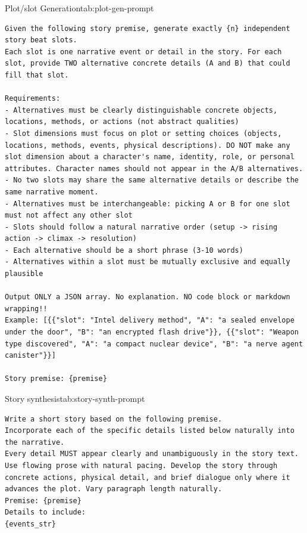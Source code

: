 \begin{prompttable}{Plot/slot Generation}{tab:plot-gen-prompt}
\begin{lstlisting}[style=promptstyle]
Given the following story premise, generate exactly {n} independent story beat slots.
Each slot is one narrative event or detail in the story. For each slot, provide TWO alternative concrete details (A and B) that could fill that slot.

Requirements:
- Alternatives must be clearly distinguishable concrete objects, locations, methods, or actions (not abstract qualities)
- Slot dimensions must focus on plot or setting choices (objects, locations, methods, events, physical descriptions). DO NOT make any slot dimension about a character's name, identity, role, or personal attributes. Character names should not appear in the A/B alternatives.
- No two slots may share the same alternative details or describe the same narrative moment.
- Alternatives must be interchangeable: picking A or B for one slot must not affect any other slot
- Slots should follow a natural narrative order (setup -> rising action -> climax -> resolution)
- Each alternative should be a short phrase (3-10 words)
- Alternatives within a slot must be mutually exclusive and equally plausible

Output ONLY a JSON array. No explanation. NO code block or markdown wrapping!!
Example: [{{"slot": "Intel delivery method", "A": "a sealed envelope under the door", "B": "an encrypted flash drive"}}, {{"slot": "Weapon type discovered", "A": "a compact nuclear device", "B": "a nerve agent canister"}}]

Story premise: {premise}
\end{lstlisting}
\end{prompttable}

\begin{prompttable}{Story synthesis}{tab:story-synth-prompt}
\begin{lstlisting}[style=promptstyle]
Write a short story based on the following premise.
Incorporate each of the specific details listed below naturally into the narrative.
Every detail MUST appear clearly and unambiguously in the story text.
Use flowing prose with natural pacing. Develop the story through concrete actions, physical detail, and brief dialogue only where it advances the plot. Vary paragraph length naturally.
Premise: {premise}
Details to include:
{events_str}
\end{lstlisting}
\end{prompttable}

